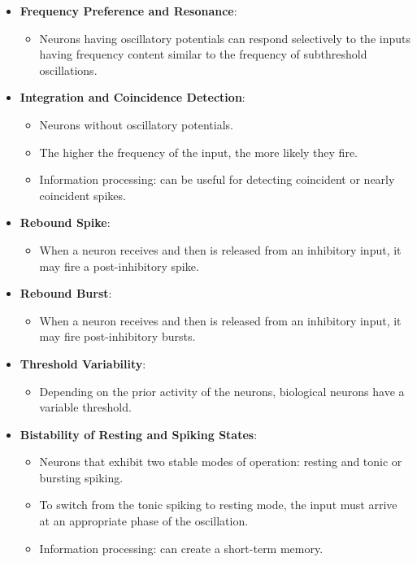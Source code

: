 \documentclass{article} %
\begin{document}
\begin{itemize}
    \item \textbf{Frequency Preference and Resonance}:
    \begin{itemize}
        \item Neurons having oscillatory potentials can respond selectively to the inputs having frequency content similar to the frequency of subthreshold oscillations.
    \end{itemize}
    
    \item \textbf{Integration and Coincidence Detection}:
    \begin{itemize}
        \item Neurons without oscillatory potentials.
        \item The higher the frequency of the input, the more likely they fire.
        \item Information processing: can be useful for detecting coincident or nearly coincident spikes.
    \end{itemize}
    
    \item \textbf{Rebound Spike}:
    \begin{itemize}
        \item When a neuron receives and then is released from an inhibitory input, it may fire a post-inhibitory spike.
    \end{itemize}
    
    \item \textbf{Rebound Burst}:
    \begin{itemize}
        \item When a neuron receives and then is released from an inhibitory input, it may fire post-inhibitory bursts.
    \end{itemize}
    
    \item \textbf{Threshold Variability}:
    \begin{itemize}
        \item Depending on the prior activity of the neurons, biological neurons have a variable threshold.
    \end{itemize}
    
    \item \textbf{Bistability of Resting and Spiking States}:
    \begin{itemize}
        \item Neurons that exhibit two stable modes of operation: resting and tonic or bursting spiking.
        \item To switch from the tonic spiking to resting mode, the input must arrive at an appropriate phase of the oscillation.
        \item Information processing: can create a short-term memory.
    \end{itemize}
    

\end{itemize}
\end{document}
